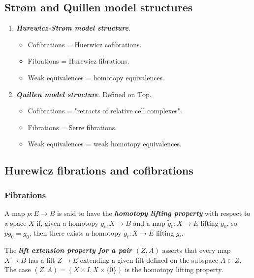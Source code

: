 \begin{remark}
\subsection{Str\o m and Quillen model structures}

\begin{example}\leavevmode
\begin{enumerate}
	\item \textbf{\textit{Hurewicz-Str\o m model structure}}.
	\begin{itemize}
		\item Cofibrations = Huerwicz cofibrations.
		\item Fibrations = Hurewicz fibrations.
		\item Weak equivalences = homotopy equivalences.
	\end{itemize}
	\item \textbf{\textit{Quillen model structure}}. Defined on $\text{Top}$.
	\begin{itemize}
		\item Cofibrations = "retracts of relative cell complexes".
		\item Fibrations = Serre fibrations.
		\item Weak equivalences = weak homotopy equivalences.
	\end{itemize}
\end{enumerate}
\end{example}

\subsection{Hurewicz fibrations and cofibrations}

\subsubsection{Fibrations}

\begin{definition}[Hatcher]
	 A map $p:E\to B$ is said to have the \textbf{\textit{homotopy lifting property}} with respect to a space $X$ if, given a homotopy $g_t:X\to B$ and a map $\tilde{g}_0:X\to E$ lifting $g_0$, so $p\tilde{g}_0=g_0$, then there exists a homotopy $\tilde{g}_t:X\to E$ lifting $g_t$.
	
	The \textbf{\textit{lift extension property for a pair $(Z,A)$}} asserts that every map $X\to B$ has a lift $Z\to E$ extending a given lift defined on the subspace $A\subset Z$. The case $(Z,A)=(X\times I,X\times\{0\})$ is the homotopy lifting property.
	

\end{definition}
\end{remark}

